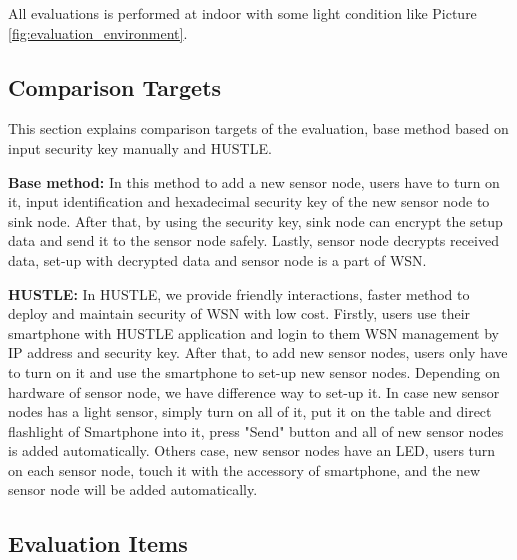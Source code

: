 All evaluations is performed at indoor with some light condition like Picture \ref{fig:evaluation_environment}.

\subsection{Comparison Targets}\label{sec:evaluation_methodology_target}

This section explains comparison targets of the evaluation, base method based on input security key manually and HUSTLE.

{\bf Base method:} In this method to add a new sensor node, users have to turn on it, input identification and hexadecimal security key of the new sensor node to sink node. After that, by using the security key, sink node can encrypt the setup data and send it to the sensor node safely. Lastly, sensor node decrypts received data, set-up with decrypted data and sensor node is a part of WSN.

{\bf HUSTLE:} In HUSTLE, we provide friendly interactions, faster method to deploy and maintain security of WSN with low cost. Firstly, users use their smartphone with HUSTLE application and login to them WSN management by IP address and security key. After that, to add new sensor nodes, users only have to turn on it and use the smartphone to set-up new sensor nodes. Depending on hardware of sensor node, we have difference way to set-up it. In case new sensor nodes has a light sensor, simply turn on all of it, put it on the table and direct flashlight of Smartphone into it, press "Send" button and all of new sensor nodes is added automatically. Others case, new sensor nodes have an LED, users turn on each sensor node, touch it with the accessory of smartphone, and the new sensor node will be added automatically.
\subsection{Evaluation Items}\label{sec:evaluation_methodology_items}

